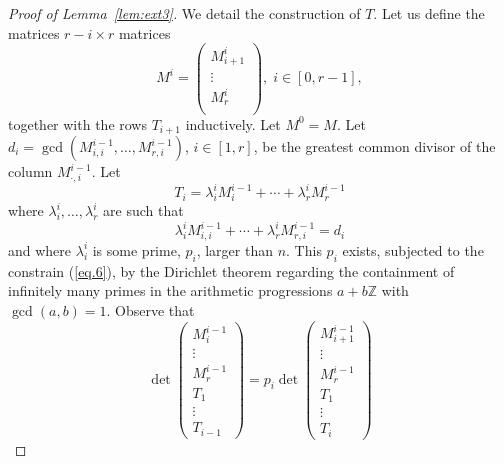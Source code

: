 \documentclass[10pt]{article}
\newcommand{\Z}{\mathbb Z}
\begin{document}
\begin{proof}[Proof of Lemma~\ref{lem:ext3}]
	We detail the construction of $T$.
Let us define the matrices $r-i\times r$ matrices 
\begin{displaymath}
	M^i=\begin{pmatrix} M^i_{i+1} \\ \vdots \\ M^i_r \\
	\end{pmatrix},\; i\in [0,r-1],
	\end{displaymath}  together with the rows $T_{i+1}$ inductively.  Let $M^0=M$. Let $d_i=\gcd(M^{i-1}_{i,i},\ldots,M^{i-1}_{r,i})$, $i\in[1,r]$, be the greatest common divisor of the column $M_{\cdot,i}^{i-1}$. Let
\begin{displaymath}
	T_{i}=\lambda_{i}^{i} M^{i-1}_{i}+ \cdots + \lambda_r^{i} M^{i-1}_{r}
\end{displaymath}
where 
$\lambda_{i}^{i}, \ldots,\lambda_r^{i}$ are such that
\begin{equation} \label{eq.6}
	\lambda_{i}^{i} M^{i-1}_{i,i}+ \cdots + \lambda_r^{i} M^{i-1}_{r,i}=d_{i}
\end{equation}
and where $\lambda_{i}^{i}$ is some prime, $p_{i}$, larger than $n$.
 This $p_{i}$ exists, subjected to the constrain (\ref{eq.6}), by the Dirichlet theorem regarding the containment of infinitely many primes in the arithmetic progressions $a+b\Z$ with $\gcd(a,b)=1$. Observe that
\begin{displaymath}
		\det
		\begin{pmatrix}
			M^{i-1}_{i} \\
			\vdots \\
			M^{i-1}_r\\
		T_1\\
		\vdots\\
		T_{i-1}
		\end{pmatrix}
=p_{i}
				\det
				\begin{pmatrix}
					M^{i-1}_{i+1} \\
					\vdots \\
					M^{i-1}_r\\
				T_1\\
				\vdots\\
				T_{i}
			\end{pmatrix} 
\end{displaymath}
 



\end{proof}
\end{document}
